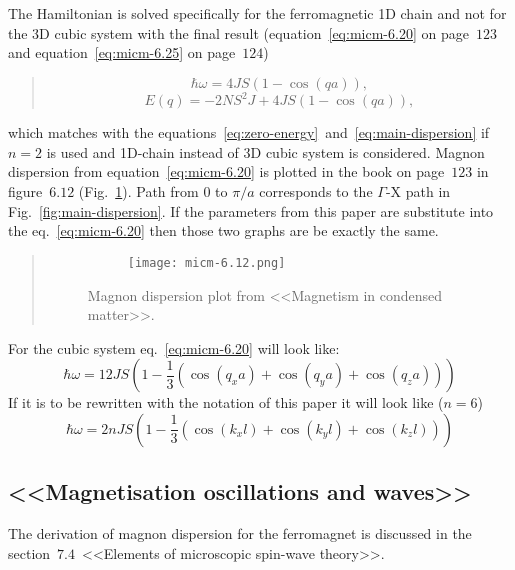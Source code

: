     The Hamiltonian is solved specifically for the ferromagnetic 1D chain and not for the 3D cubic system with the final result (equation~\ref{eq:micm-6.20} on page~$123$ and equation~\ref{eq:micm-6.25} on page~$124$)
    \begin{quote}
        \begin{equation}
            \hbar\omega = 4JS(1 - \cos(qa)), \label{eq:micm-6.20} \tag{6.20}
        \end{equation}
        \begin{equation}
           E(q) = -2NS^2J + 4JS(1 - \cos(qa)), \label{eq:micm-6.25} \tag{6.25}
        \end{equation}
    \end{quote}
    which matches with the equations~\eqref{eq:zero-energy}~and~\eqref{eq:main-dispersion} if $n = 2$ is used and 1D-chain instead of 3D cubic system is considered. 
    Magnon dispersion from equation~\eqref{eq:micm-6.20} is plotted in the book on page~$123$ in figure~$6.12$ (Fig.~\ref{fig:micm-6.12}). 
    Path from $0$ to $\pi / a$ corresponds to the $\Gamma$-X path in Fig.~\ref{fig:main-dispersion}. If the parameters from this paper are substitute into the eq.~\eqref{eq:micm-6.20} then those two graphs are be exactly the same.
    \begin{quote}
        \begin{figure}[H]
            \centering
            \begin{subfigure}[b]{0.5\textwidth}
                \centering
                \texttt{[image: micm-6.12.png]}
            \end{subfigure}
            \hfill
            \caption{Magnon dispersion plot from <<Magnetism in condensed matter>>.}
            \label{fig:micm-6.12}
        \end{figure}
    \end{quote}
    For the cubic system eq.~\ref{eq:micm-6.20} will look like:
    \begin{equation}
        \hbar\omega = 12JS(1 - \dfrac{1}{3}(\cos(q_xa) + \cos(q_ya) + \cos(q_za)))
    \end{equation}
    If it is to be rewritten with the notation of this paper it will look like ($n = 6$)
    \begin{equation}
        \hbar\omega = 2nJS(1 - \dfrac{1}{3}(\cos(k_xl) + \cos(k_yl) + \cos(k_zl)))
    \end{equation}

\subsection{<<Magnetisation oscillations and waves>>\cite{gurevich1996magnetization}}
    The derivation of magnon dispersion for the ferromagnet is discussed in the section~$7.4$~<<Elements of microscopic spin-wave theory>>.

